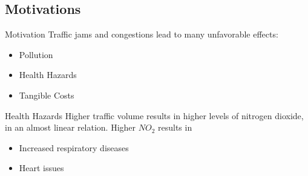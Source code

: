\subsection{Motivations}
\begin{frame}{Motivation}
Traffic jams and congestions lead to many unfavorable effects:
\begin{itemize}
	\item<2->[-] Pollution
	\item<3->[-] Health Hazards
	\item<4->[-] Tangible Costs
\end{itemize}
\end{frame}



\begin{frame}{Health Hazards}
Higher traffic volume results in higher levels of nitrogen dioxide, in an almost linear relation. \cite{zhang} Higher $NO_2$ results in
\begin{itemize}
	\item<2->[-] Increased respiratory diseases \cite{goudarzia}
	\item<3->[-] Heart issues \cite{goudarzia}
\end{itemize}
\end{frame}

